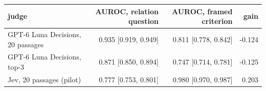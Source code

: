 \begin{tabular}{lrrr}
\toprule
judge & AUROC, relation question & AUROC, framed criterion & gain \\
\midrule
GPT-6 Luna Decisions, 20 passages & 0.935 [0.919, 0.949] & 0.811 [0.778, 0.842] & -0.124 \\
GPT-6 Luna Decisions, top-3 & 0.871 [0.850, 0.894] & 0.747 [0.714, 0.781] & -0.125 \\
Jev, 20 passages (pilot) & 0.777 [0.753, 0.801] & 0.980 [0.970, 0.987] & 0.203 \\
\bottomrule
\end{tabular}
